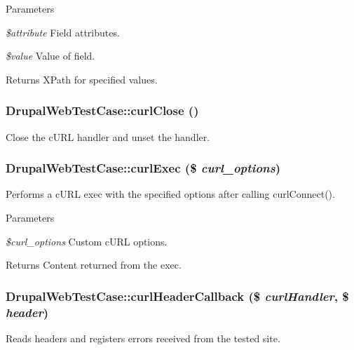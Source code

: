 \begin{DoxyParams}{Parameters}
\item[{\em \$attribute}]Field attributes. \item[{\em \$value}]Value of field. \end{DoxyParams}
\begin{DoxyReturn}{Returns}
XPath for specified values. 
\end{DoxyReturn}
\hypertarget{class_drupal_web_test_case_a0b3eb01ee1312ea28f78fc1a293835be}{
\subsubsection[{curlClose}]{\setlength{\rightskip}{0pt plus 5cm}DrupalWebTestCase::curlClose ()}}
\label{class_drupal_web_test_case_a0b3eb01ee1312ea28f78fc1a293835be}
Close the cURL handler and unset the handler. \hypertarget{class_drupal_web_test_case_aa559e47572bc90f0c8ccd1aef86fd95f}{
\subsubsection[{curlExec}]{\setlength{\rightskip}{0pt plus 5cm}DrupalWebTestCase::curlExec (\$ {\em curl\_\-options})}}
\label{class_drupal_web_test_case_aa559e47572bc90f0c8ccd1aef86fd95f}
Performs a cURL exec with the specified options after calling curlConnect().


\begin{DoxyParams}{Parameters}
\item[{\em \$curl\_\-options}]Custom cURL options. \end{DoxyParams}
\begin{DoxyReturn}{Returns}
Content returned from the exec. 
\end{DoxyReturn}
\hypertarget{class_drupal_web_test_case_a7993c14e1d81d759a6b3903764bb0e46}{
\subsubsection[{curlHeaderCallback}]{\setlength{\rightskip}{0pt plus 5cm}DrupalWebTestCase::curlHeaderCallback (\$ {\em curlHandler}, \/  \$ {\em header})}}
\label{class_drupal_web_test_case_a7993c14e1d81d759a6b3903764bb0e46}
Reads headers and registers errors received from the tested site.

